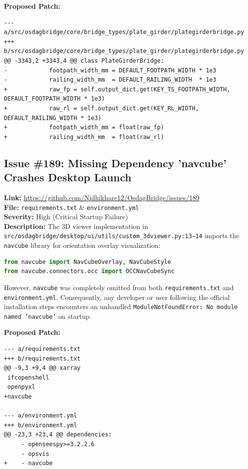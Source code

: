 \documentclass[11pt,a4paper]{article}
\begin{document}
\textbf{Proposed Patch:}
\begin{lstlisting}
--- a/src/osdagbridge/core/bridge_types/plate_girder/plategirderbridge.py
+++ b/src/osdagbridge/core/bridge_types/plate_girder/plategirderbridge.py
@@ -3343,2 +3343,4 @@ class PlateGirderBridge:
-            footpath_width_mm = DEFAULT_FOOTPATH_WIDTH * 1e3
-            railing_width_mm  = DEFAULT_RAILING_WIDTH  * 1e3
+            raw_fp = self.output_dict.get(KEY_TS_FOOTPATH_WIDTH, DEFAULT_FOOTPATH_WIDTH * 1e3)
+            raw_rl = self.output_dict.get(KEY_RL_WIDTH, DEFAULT_RAILING_WIDTH * 1e3)
+            footpath_width_mm = float(raw_fp)
+            railing_width_mm  = float(raw_rl)
\end{lstlisting}

\subsection{Issue \#189: Missing Dependency 'navcube' Crashes Desktop Launch}
\textbf{Link:} \href{https://github.com/Nidhikhare12/OsdagBridge/issues/189}{https://github.com/Nidhikhare12/OsdagBridge/issues/189}\\
\textbf{File:} \texttt{requirements.txt} \& \texttt{environment.yml}\\
\textbf{Severity:} High (Critical Startup Failure)\\
\textbf{Description:} The 3D viewer implementation in \texttt{src/osdagbridge/desktop/ui/utils/custom\_3dviewer.py:13--14} imports the \texttt{navcube} library for orientation overlay visualization:
\begin{lstlisting}[language=Python]
from navcube import NavCubeOverlay, NavCubeStyle
from navcube.connectors.occ import OCCNavCubeSync
\end{lstlisting}
However, \texttt{navcube} was completely omitted from both \texttt{requirements.txt} and \texttt{environment.yml}. Consequently, any developer or user following the official installation steps encounters an unhandled \texttt{ModuleNotFoundError: No module named 'navcube'} on startup.

\textbf{Proposed Patch:}
\begin{lstlisting}
--- a/requirements.txt
+++ b/requirements.txt
@@ -9,3 +9,4 @@ xarray
 ifcopenshell
 openpyxl
+navcube

--- a/environment.yml
+++ b/environment.yml
@@ -23,3 +23,4 @@ dependencies:
     - openseespy>=3.2.2.6
     - opsvis
+    - navcube
\end{lstlisting}
\end{document}
